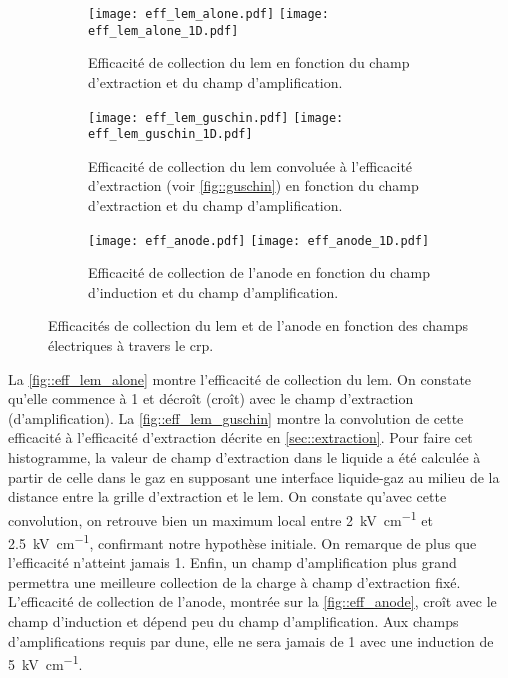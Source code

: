       \begin{figure}[htpb]
        \begin{subfigure}{\textwidth}
          \centering
          \texttt{[image: eff\_lem\_alone.pdf]}
          \texttt{[image: eff\_lem\_alone\_1D.pdf]}
          \caption{\label{fig::eff_lem_alone}Efficacité de collection du \gls{lem} en fonction du champ d'extraction et du champ d'amplification.}
        \end{subfigure}\hfill
        \begin{subfigure}{\textwidth}
          \centering
          \texttt{[image: eff\_lem\_guschin.pdf]}
          \texttt{[image: eff\_lem\_guschin\_1D.pdf]}
          \caption{\label{fig::eff_lem_guschin}Efficacité de collection du \gls{lem} convoluée à l'efficacité d'extraction (voir \autoref{fig::guschin}) en fonction du champ d'extraction et du champ d'amplification.}
        \end{subfigure}\hfill
        \begin{subfigure}{\textwidth}
          \centering
          \texttt{[image: eff\_anode.pdf]}
          \texttt{[image: eff\_anode\_1D.pdf]}
          \caption{\label{fig::eff_anode}Efficacité de collection de l'anode en fonction du champ d'induction et du champ d'amplification.}
        \end{subfigure}
        \caption[Efficacités de collection du LEM et de l'anode en fonction des champs électriques à travers le CRP]{\label{fig::eff_coll}Efficacités de collection du \gls{lem} et de l'anode en fonction des champs électriques à travers le \gls{crp}.}
      \end{figure}

      La \autoref{fig::eff_lem_alone} montre l'efficacité de collection du \gls{lem}. On constate qu'elle commence à 1 et décroît (croît) avec le champ d'extraction (d'amplification). La \autoref{fig::eff_lem_guschin} montre la convolution de cette efficacité à l'efficacité d'extraction décrite en \autoref{sec::extraction}. Pour faire cet histogramme, la valeur de champ d'extraction dans le liquide a été calculée à partir de celle dans le gaz en supposant une interface liquide-gaz au milieu de la distance entre la grille d'extraction et le \gls{lem}. On constate qu'avec cette convolution, on retrouve bien un maximum local entre \SI{2}{\kilo\volt\per\centi\meter} et \SI{2.5}{\kilo\volt\per\centi\meter}, confirmant notre hypothèse initiale. On remarque de plus que l'efficacité n'atteint jamais 1. Enfin, un champ d'amplification plus grand permettra une meilleure collection de la charge à champ d'extraction fixé. L'efficacité de collection de l'anode, montrée sur la \autoref{fig::eff_anode}, croît avec le champ d'induction et dépend peu du champ d'amplification. Aux champs d'amplifications requis par \gls{dune}, elle ne sera jamais de 1 avec une induction de \SI{5}{\kilo\volt\per\centi\meter}.

